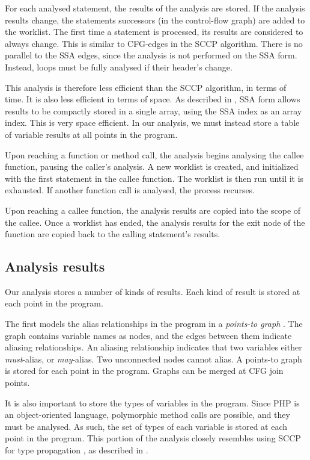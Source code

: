 For each analysed statement, the results of the analysis are stored.
If the analysis results change, the statements successors (in the control-flow graph) are added to the worklist.
The first time a statement is processed, its results are considered to always change.
This is similar to CFG-edges in the SCCP algorithm.
There is no parallel to the SSA edges, since the analysis is not performed on the SSA form.
Instead, loops must be fully analysed if their header's change.

This analysis is therefore less efficient than the SCCP algorithm, in terms of time.
It is also less efficient in terms of space.
As described in , SSA form allows results to be compactly stored in a single array, using the SSA index as an array index.
This is very space efficient.
In our analysis, we must instead store a table of variable results at all points in the program.

Upon reaching a function or method call, the analysis begins analysing the callee function, pausing the caller's analysis.
A new worklist is created, and initialized with the first statement in the callee function.
The worklist is then run until it is exhausted.
If another function call is analysed, the process recurses.

Upon reaching a callee function, the analysis results are copied into the scope of the callee.
Once a worklist has ended, the analysis results for the exit node of the function are copied back to the calling statement's results.

\subsection{Analysis results}

Our analysis stores a number of kinds of results.
Each kind of result is stored at each point in the program.

The first models the alias relationships in the program in a \textit{points-to graph} \cite{emami}.
The graph contains variable names as nodes, and the edges between them indicate aliasing relationships.
An aliasing relationship indicates that two variables either \textit{must}-alias, or \textit{may}-alias.
Two unconnected nodes cannot alias.
A points-to graph is stored for each point in the program.
Graphs can be merged at CFG join points.

It is also important to store the types of variables in the program.
Since PHP is an object-oriented language, polymorphic method calls are possible, and they must be analysed.
As such, the set of types of each variable is stored at each point in the program.
This portion of the analysis closely resembles using SCCP for type propagation \cite{lenartsadler}, as described in .

